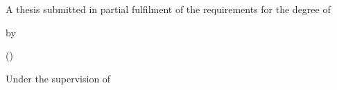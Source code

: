 \begin{titlepage}
\centering
\vspace*{1cm}
{\LARGE\bfseries \thesistitle\par}
\vspace{1.5cm}
{\large A thesis submitted in partial fulfilment of the requirements for the degree of\par}
\vspace{0.4cm}
{\large\bfseries \degree\par}
\vspace{1.5cm}
{\large by\par}
\vspace{0.3cm}
{\Large\bfseries \authorname\par}
{\large (\rollno)\par}
\vspace{1.5cm}
{\large Under the supervision of\par}
\vspace{0.3cm}
{\large\bfseries \supervisor\par}
{\large \supervisordesig\par}
\vfill
{\large \department\par}
{\large\bfseries \institute\par}
{\large \submissiondate\par}
\end{titlepage}
